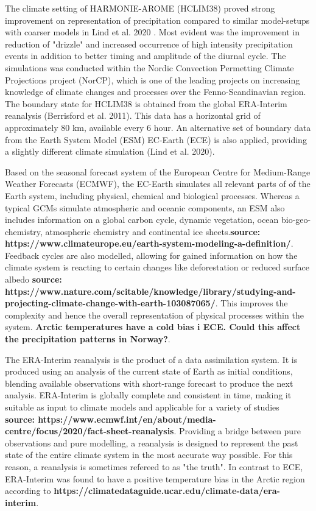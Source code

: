 The climate setting of HARMONIE-AROME (HCLIM38) proved strong improvement on representation of precipitation compared to similar model-setups with coarser models in Lind et al. 2020 \cite{lind_arome}. Most evident was the improvement in reduction of "drizzle" and increased occurrence of high intensity precipitation events in addition to better timing and amplitude of the diurnal cycle. The simulations was conducted within the Nordic Convection Permetting Climate Projections project (NorCP), which is one of the leading projects on increasing knowledge of climate changes and processes over the Fenno-Scandinavian region. The boundary state for HCLIM38 is obtained from the global ERA-Interim reanalysis (Berrisford et al. 2011)\cite{erai}. This data has a horizontal grid of approximately 80 km, available every 6 hour. An alternative set of boundary data from the Earth System Model (ESM) EC-Earth (ECE) is also applied, providing a slightly different climate simulation (Lind et al. 2020)\cite{lind_arome}.    

Based on the seasonal forecast system of the European Centre for Medium-Range Weather Forecasts (ECMWF), the EC-Earth simulates all relevant parts of of the Earth system, including physical, chemical and biological processes. Whereas a typical GCMs simulate atmospheric and oceanic components, an ESM also includes information on a global carbon cycle, dynamic vegetation, ocean bio-geo-chemistry, atmospheric chemistry and continental ice sheets.\textbf{source: https://www.climateurope.eu/earth-system-modeling-a-definition/}. Feedback cycles are also modelled, allowing for gained information on how the climate system is reacting to certain changes like deforestation or reduced surface albedo \textbf{source: https://www.nature.com/scitable/knowledge/library/studying-and-projecting-climate-change-with-earth-103087065/}. This improves the complexity and hence the overall representation of physical processes within the system. \textbf{Arctic temperatures have a cold bias i ECE. Could this affect the precipitation patterns in Norway?}.

The ERA-Interim reanalysis is the product of a data assimilation system. It is produced using an analysis of the current state of Earth as initial conditions, blending available observations with short-range forecast to produce the next analysis. ERA-Interim is globally complete and consistent in time, making it suitable as input to climate models and applicable for a variety of studies \textbf{source: https://www.ecmwf.int/en/about/media-centre/focus/2020/fact-sheet-reanalysis}. Providing a bridge between pure observations and pure modelling, a reanalysis is designed to represent the past state of the entire climate system in the most accurate way possible. For this reason, a reanalysis is sometimes refereed to as "the truth". In contrast to ECE, ERA-Interim was found to have a positive temperature bias in the Arctic region according to \textbf{https://climatedataguide.ucar.edu/climate-data/era-interim}.  

